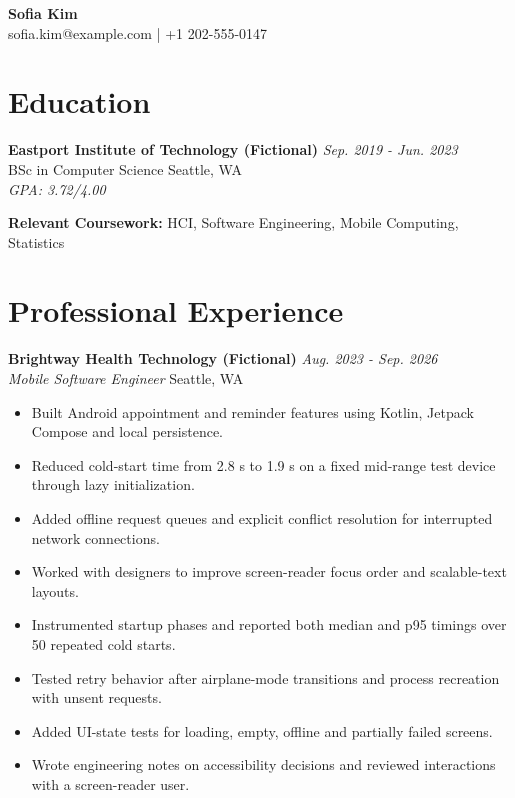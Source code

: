 \documentclass[11pt,a4paper]{article}
\begin{document}
\begin{center}
{\Huge\bfseries Sofia Kim}\\[6pt]
{\small sofia.kim@example.com \quad | \quad +1 202-555-0147}
\end{center}
\section{Education}
\textbf{Eastport Institute of Technology (Fictional)} \hfill \textit{Sep. 2019 - Jun. 2023}\\
BSc in Computer Science \hfill Seattle, WA\\
\textit{GPA: 3.72/4.00}

\textbf{Relevant Coursework:} HCI, Software Engineering, Mobile Computing, Statistics
\vspace{4pt}

\section{Professional Experience}
\textbf{Brightway Health Technology (Fictional)} \hfill \textit{Aug. 2023 - Sep. 2026}\\
\textit{Mobile Software Engineer} \hfill Seattle, WA
\begin{itemize}[leftmargin=*,noitemsep,topsep=2pt]
\item Built Android appointment and reminder features using Kotlin, Jetpack Compose and local persistence.
\item Reduced cold-start time from 2.8 s to 1.9 s on a fixed mid-range test device through lazy initialization.
\item Added offline request queues and explicit conflict resolution for interrupted network connections.
\item Worked with designers to improve screen-reader focus order and scalable-text layouts.
\item Instrumented startup phases and reported both median and p95 timings over 50 repeated cold starts.
\item Tested retry behavior after airplane-mode transitions and process recreation with unsent requests.
\item Added UI-state tests for loading, empty, offline and partially failed screens.
\item Wrote engineering notes on accessibility decisions and reviewed interactions with a screen-reader user.
\end{itemize}
\vspace{4pt}
\end{document}
